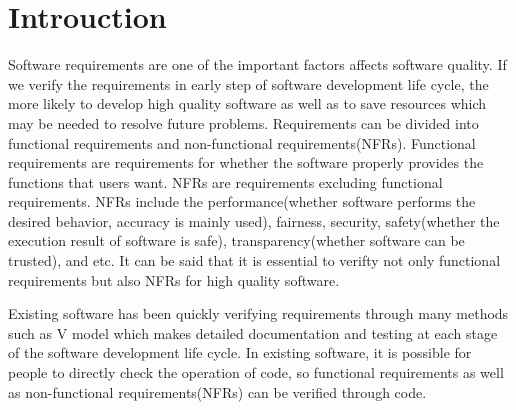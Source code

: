 \documentclass[journal,article,submit,moreauthors,pdftex]{Definitions/mdpi}
\begin{document}
\section{Introuction}

Software requirements are one of the important factors affects software quality.
If we verify the requirements in early step of software development life cycle, the more likely to develop high quality software as well as to save resources which may be needed to resolve future problems.
Requirements can be divided into functional requirements and non-functional requirements(NFRs).
Functional requirements are requirements for whether the software properly provides the functions that users want.
NFRs are requirements excluding functional requirements. NFRs include the performance(whether software performs the desired behavior, accuracy is mainly used), fairness\cite{fairness-microsoft, fairness-dwork, fairness-feldman, fairness-tramer, fairness-zhang, fairness-zemel}, security\cite{security-mei, security-mei2, security-barreno}, safety(whether the execution result of software is safe)\cite{safety-amodei,safety-juric,safety-leike}, transparency(whether software can be trusted)\cite{transparency-yosinski,xai-transparency-ribeiro,xai-transparency-murdoch}, and etc. %
It can be said that it is essential to verifty not only functional requirements but also NFRs for high quality software.

Existing software has been quickly verifying requirements through many methods such as V model which makes detailed documentation and testing at each stage of the software development life cycle.
In existing software, it is possible for people to directly check the operation of code, so functional requirements as well as non-functional requirements(NFRs) can be verified through code.
\end{document}
